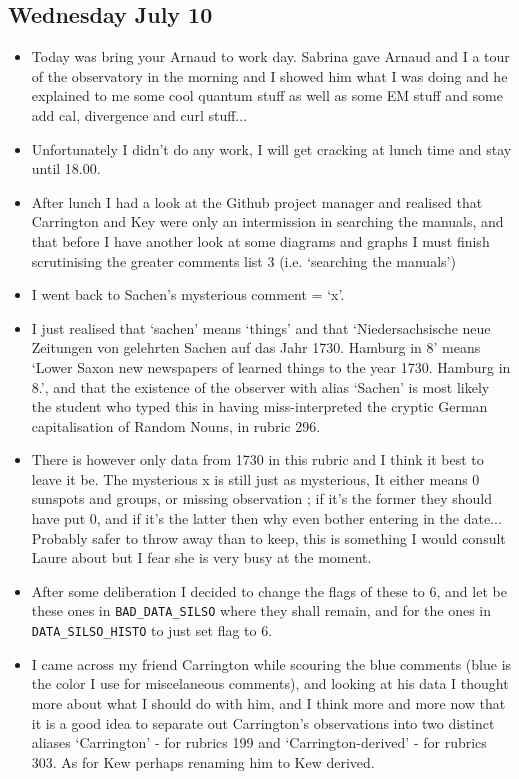 \documentclass[12pt]{article}
\begin{document}
\subsection{Wednesday July 10}
\begin{itemize}
    \item Today was bring your Arnaud to work day. Sabrina gave Arnaud and I a tour of the observatory in the morning and I showed him what I was doing and he explained to me some cool quantum stuff as well as some EM stuff and some add cal, divergence and curl stuff... 
    \item Unfortunately I didn't do any work, I will get cracking at lunch time and stay until 18.00.
    \item After lunch I had a look at the Github project manager and realised that Carrington and Key were only an intermission in searching the manuals, and that before I have another look at some diagrams and graphs I must finish scrutinising the greater comments list 3 (i.e. `searching the manuals')
    \item I went back to Sachen's mysterious comment = `x'.
    \item I just realised that `sachen' means `things' and that `Niedersachsische neue Zeitungen von gelehrten Sachen auf das Jahr 1730. Hamburg in 8' means `Lower Saxon new newspapers of learned things to the year 1730. Hamburg in 8.', and that the existence of the observer with alias `Sachen' is most likely the student who typed this in having miss-interpreted the cryptic German capitalisation of Random Nouns, in rubric 296.
    \item There is however only data from 1730 in this rubric and I think it best to leave it be. The mysterious x is still just as mysterious, It either means 0 sunspots and groups, or missing observation ; if it's the former they should have put 0, and if it's the latter then why even bother entering in the date... Probably safer to throw away than to keep, this is something I would consult Laure about but I fear she is very busy at the moment.
    \item After some deliberation I decided to change the flags of these to 6, and let be these ones in \texttt{BAD\_DATA\_SILSO} where they shall remain, and for the ones in \texttt{DATA\_SILSO\_HISTO} to just set flag to 6.
    \item I came across my friend Carrington while scouring the blue comments (blue is the color I use for miscelaneous comments), and looking at his data I thought more about what I should do with him, and I think more and more now that it is a good idea to separate out Carrington's observations into two distinct aliases `Carrington' - for rubrics 199 and `Carrington-derived' - for rubrics 303. As for Kew perhaps renaming him to Kew derived.

\end{itemize}
\end{document}
